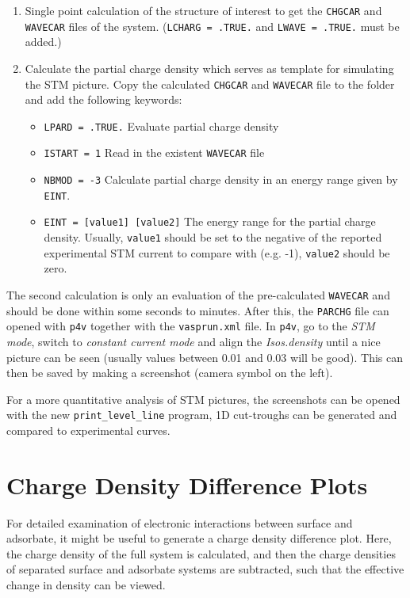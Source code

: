 \documentclass[a4paper,11pt]{article}
\begin{document}
\begin{enumerate}
 \item Single point calculation of the structure of interest to get the \texttt{CHGCAR} and \texttt{WAVECAR} files of the system.
 (\texttt{LCHARG = .TRUE.} and \texttt{LWAVE = .TRUE.} must be added.)
 \item Calculate the partial charge density which serves as template for simulating the STM picture.
Copy the calculated \texttt{CHGCAR} and \texttt{WAVECAR} file to the folder and add the following keywords:
\begin{itemize}
 \item \texttt{LPARD = .TRUE.} Evaluate partial charge density
 \item \texttt{ISTART = 1} Read in the existent \texttt{WAVECAR} file
 \item \texttt{NBMOD = -3} Calculate partial charge density in an energy range given by \texttt{EINT}.
 \item \texttt{EINT = [value1] [value2]} The energy range for the partial charge density. Usually, \texttt{value1}
 should be set to the negative of the reported experimental STM current to compare with (e.g. -1), \texttt{value2}
 should be zero.
\end{itemize}
\end{enumerate}

The second calculation is only an evaluation of the pre-calculated \texttt{WAVECAR} and should be done within
some seconds to minutes.
After this, the \texttt{PARCHG} file can opened with \texttt{p4v} together with the \texttt{vasprun.xml} file.
In \texttt{p4v}, go to the \textit{STM mode}, switch to \textit{constant current mode} and align the \textit{Isos.density} until
a nice picture can be seen (usually values between 0.01 and 0.03 will be good). This can then be saved by making a screenshot (camera symbol on the left).

For a more quantitative analysis of STM pictures, the screenshots can be opened with the new \texttt{print\_level\_line}
program, 1D cut-troughs can be generated and compared to experimental curves.



\section{Charge Density Difference Plots}

For detailed examination of electronic interactions between surface and adsorbate, it might be useful
to generate a charge density difference plot.
Here, the charge density of the full system is calculated, and then the charge densities of separated 
surface and adsorbate systems are subtracted, such that the effective change in density can be viewed.
\end{document}
